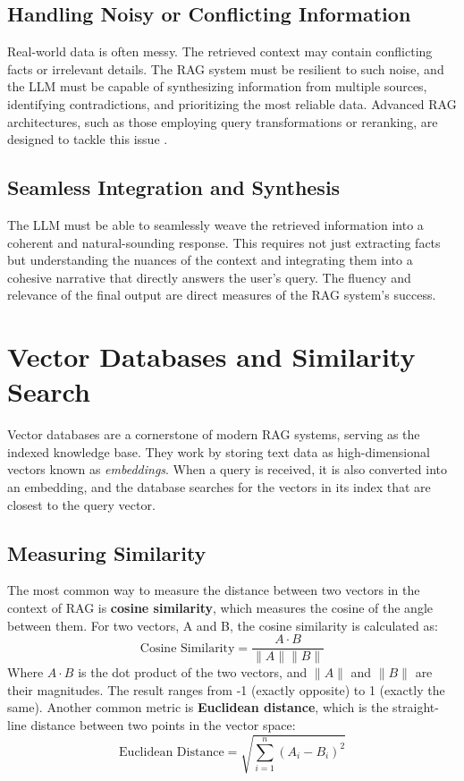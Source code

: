 \subsection{Handling Noisy or Conflicting Information}
Real-world data is often messy. The retrieved context may contain conflicting facts or irrelevant details. The RAG system must be resilient to such noise, and the LLM must be capable of synthesizing information from multiple sources, identifying contradictions, and prioritizing the most reliable data. Advanced RAG architectures, such as those employing query transformations or reranking, are designed to tackle this issue \autocite{gao2024retrievalaugmented, rag_fusion_2024}.

\subsection{Seamless Integration and Synthesis}
The LLM must be able to seamlessly weave the retrieved information into a coherent and natural-sounding response. This requires not just extracting facts but understanding the nuances of the context and integrating them into a cohesive narrative that directly answers the user's query. The fluency and relevance of the final output are direct measures of the RAG system's success.

\section{Vector Databases and Similarity Search}
Vector databases are a cornerstone of modern RAG systems, serving as the indexed knowledge base. They work by storing text data as high-dimensional vectors known as \textit{embeddings}. When a query is received, it is also converted into an embedding, and the database searches for the vectors in its index that are closest to the query vector.

\subsection{Measuring Similarity}
The most common way to measure the distance between two vectors in the context of RAG is \textbf{cosine similarity}, which measures the cosine of the angle between them. For two vectors, A and B, the cosine similarity is calculated as:
\begin{equation}
\text{Cosine Similarity} = \frac{A \cdot B}{\|A\| \|B\|}
\end{equation}
Where \(A \cdot B\) is the dot product of the two vectors, and \(\|A\|\) and \(\|B\|\) are their magnitudes. The result ranges from -1 (exactly opposite) to 1 (exactly the same).
Another common metric is \textbf{Euclidean distance}, which is the straight-line distance between two points in the vector space:
\begin{equation}
\text{Euclidean Distance} = \sqrt{\sum_{i=1}^{n} (A_i - B_i)^2}
\end{equation}

